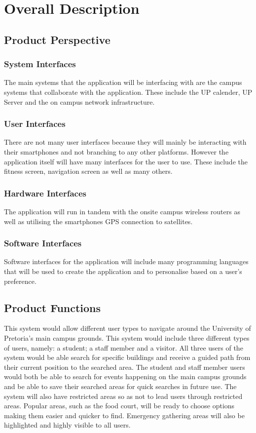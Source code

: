 \documentclass{article}
\begin{document}
\section{Overall Description}
	\subsection{Product Perspective}
		\subsubsection{System Interfaces}
		The  main systems that the application will be interfacing with are the campus systems that collaborate with the application. These include the UP calender, UP Server and the on campus network infrastructure.
		\subsubsection{User Interfaces}
		There are not many user interfaces because they will mainly be interacting with their smartphones and not branching to any other platforms. However the application itself will have many interfaces for the user to use. These include the fitness screen, navigation screen as well as many others.
		\subsubsection{Hardware Interfaces}
		The application will run in tandem with the onsite campus wireless routers as well as utilising the smartphones GPS connection to satellites.
		\subsubsection{Software Interfaces}
		Software interfaces for the application will include many programming languages that will be used to create the application and to personalise based on a user’s preference.
	\subsection{Product Functions}
	This system would allow different user types to navigate around the University of Pretoria's main campus grounds.
	This system would include three different types of users, namely: a student; a staff member and a visitor. All three
	users of the system would be able search for specific buildings and receive a guided path from their current position 
	to the searched area. The student and staff member users would both be able to search for events happening on 
	the main campus grounds and be able to save their searched areas for quick searches in future use. The system
	will also have restricted areas so as not to lead users through restricted areas. Popular areas, such as the food court,
	will be ready to choose options making them easier and quicker to find. Emergency gathering areas will also be highlighted
	and highly visible to all users.
\end{document}
